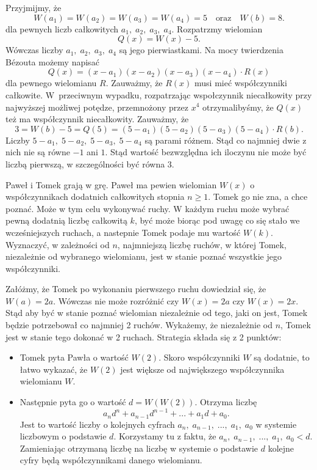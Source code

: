 \noindent
Przyjmijmy, że
\[
    W(a_1) = W(a_2) = W(a_3) = W(a_4) = 5 \quad \text{oraz} \quad W(b) = 8.
\]
dla pewnych liczb całkowitych $a_1, \; a_2, \; a_3, \; a_4$.
Rozpatrzmy wielomian
\[
    Q(x) = W(x) - 5.
\]
Wówczas liczby $a_1, \; a_2, \; a_3, \; a_4$ są jego pierwiastkami. Na mocy twierdzenia Bézouta możemy napisać
\[
    Q(x) = (x - a_1)(x - a_2)(x - a_3)(x - a_4) \cdot R(x)
\]
dla pewnego wielomianu $R$. Zauważmy, że $R(x)$ musi mieć współczynniki całkowite. W~przeciwnym wypadku, rozpatrzając wspołczynnik niecałkowity przy najwyższej możliwej potędze, przemnożony przez $x^4$ otrzymalibyśmy, że $Q(x)$ też ma współczynnik niecałkowity.
Zauważmy, że
\[
    3 = W(b) - 5 = Q(5) = (5 - a_1)(5 - a_2)(5 - a_3)(5 - a_4) \cdot R(b).
\]
Liczby $5 - a_1, \; 5 - a_2, \;5 - a_3, \;5 - a_4$ są parami różnem. Stąd co najmniej dwie z nich nie są równe $-1$ ani $1$. Stąd wartość bezwzględna ich iloczynu nie może być liczbą pierwszą, w szczególności być równa $3$.


\begin{problem}{6}
    Paweł i Tomek grają w grę.
    Paweł ma pewien wielomian $W(x)$ o współczynnikach dodatnich całkowitych stopnia $n \geqslant 1$. Tomek go nie zna, a chce poznać. Może w tym celu wykonywać ruchy. W każdym ruchu może wybrać pewną dodatnią liczbę całkowitą $k$, być może biorąc pod uwagę co się stało we wcześniejszych ruchach, a nastepnie Tomek podaje mu wartość $W(k)$. Wyznaczyć, w zależności od $n$, najmniejszą liczbę ruchów, w której Tomek, niezależnie od wybranego wielomianu, jest w stanie poznać wszystkie jego współczynniki.
\end{problem}

\noindent
Załóżmy, że Tomek po wykonaniu pierwszego ruchu dowiedział się, że $W(a) = 2a$. Wówczas nie może rozróżnić czy $W(x) = 2a$ czy $W(x) = 2x$. Stąd aby być w stanie poznać wielomian niezależnie od tego, jaki on jest, Tomek będzie potrzebował co najmniej 2 ruchów.
Wykażemy, że niezależnie od $n$, Tomek jest w stanie tego dokonać w 2 ruchach.
Strategia składa się z 2 punktów:
\begin{itemize}
    \item Tomek pyta Pawła o wartość $W(2)$. Skoro współczynniki $W$ są dodatnie, to łatwo wykazać, że $W(2)$ jest większe od największego współczynnika wielomianu $W$.
    \item Następnie pyta go o wartość $d = W(W(2))$. Otrzyma liczbę
    \[
        a_n d^n + a_{n - 1}d^{n - 1} + ... + a_1d + a_0.
    \]
    Jest to wartość liczby o kolejnych cyfrach $a_n, \; a_{n - 1}, \; ..., \; a_{1}, \; a_0$ w systemie liczbowym o podstawie $d$. Korzystamy tu z faktu, że $a_n, \; a_{n - 1}, \; ..., \; a_{1}, \; a_0 < d$. Zamieniając otrzymaną liczbę na liczbę w systemie o podstawie $d$ kolejne cyfry będą współczynnikami danego wielomianu.
\end{itemize}

